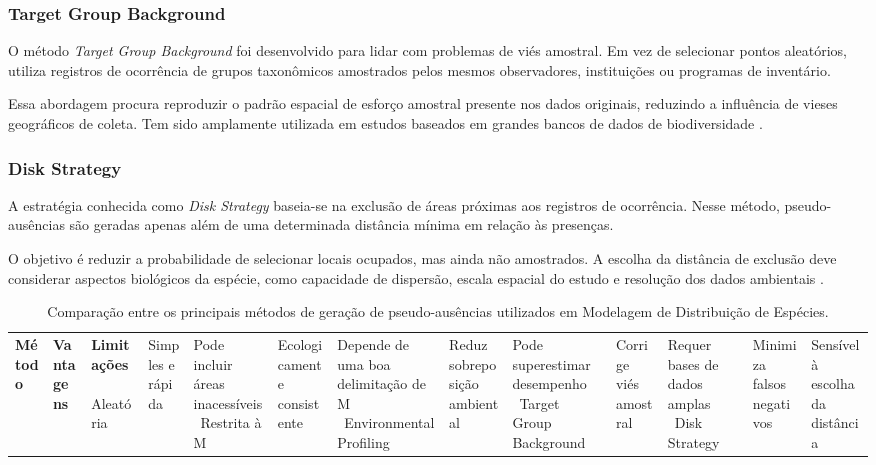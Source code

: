 \subsubsection{Target Group Background}

O método \textit{Target Group Background} foi desenvolvido para lidar com problemas de viés amostral. Em vez de selecionar pontos aleatórios, utiliza registros de ocorrência de grupos taxonômicos amostrados pelos mesmos observadores, instituições ou programas de inventário.

Essa abordagem procura reproduzir o padrão espacial de esforço amostral presente nos dados originais, reduzindo a influência de vieses geográficos de coleta. Tem sido amplamente utilizada em estudos baseados em grandes bancos de dados de biodiversidade \citep{phillips2009sample}.

\subsubsection{Disk Strategy}

A estratégia conhecida como \textit{Disk Strategy} baseia-se na exclusão de áreas próximas aos registros de ocorrência. Nesse método, pseudo-ausências são geradas apenas além de uma determinada distância mínima em relação às presenças.

O objetivo é reduzir a probabilidade de selecionar locais ocupados, mas ainda não amostrados. A escolha da distância de exclusão deve considerar aspectos biológicos da espécie, como capacidade de dispersão, escala espacial do estudo e resolução dos dados ambientais \citep{vanproosdij2016minimum}.

\begin{table}[H]
	\centering
	\caption{Comparação entre os principais métodos de geração de pseudo-ausências utilizados em Modelagem de Distribuição de Espécies.}
	\label{tab:metodos_pseudoausencias}
	\begin{tabular}{p{3.5cm}p{4cm}p{5cm}}
		\toprule
		\textbf{Método} & \textbf{Vantagens} & \textbf{Limitações} \
		\midrule
		Aleatória & Simples e rápida & Pode incluir áreas inacessíveis \
		Restrita à M & Ecologicamente consistente & Depende de uma boa delimitação de M \
		Environmental Profiling & Reduz sobreposição ambiental & Pode superestimar desempenho \
		Target Group Background & Corrige viés amostral & Requer bases de dados amplas \
		Disk Strategy & Minimiza falsos negativos & Sensível à escolha da distância \
		\bottomrule
	\end{tabular}
\end{table}

